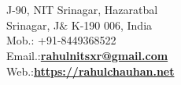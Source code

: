 
\hspace*{0pt}\hfill    \\
\hspace*{0pt}\hfill    \\
J-90, NIT Srinagar, Hazaratbal \\
Srinagar, J$\&$ K-190 006, India \\
Mob.: +91-8449368522 \\
Email.:\textbf{\href{mailto:rahulnitsxr@gmail.com}{rahulnitsxr@gmail.com}} \\
Web.:\textbf{\href{https://rahulchauhan.net}{https://rahulchauhan.net}}
\vspace{0.2cm}
